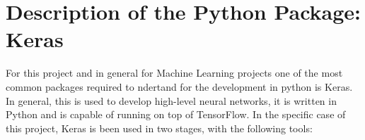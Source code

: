 %
%


\chapter{Description of the Python Package: Keras}

For this project and in general for Machine Learning projects one of the most common packages required to ndertand for the development in python is Keras. In general, this is used to develop high-level neural networks, it is written in Python and is capable of running on top of TensorFlow. In the specific case of this project, Keras is been used in two stages, with the following tools: 

